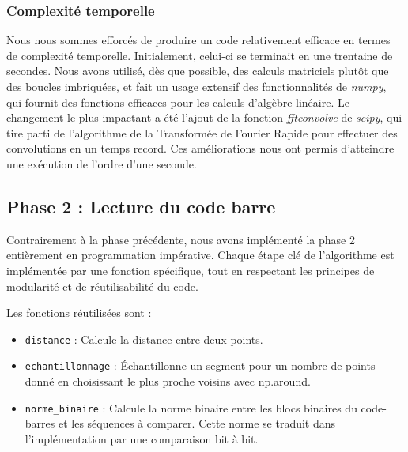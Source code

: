 \documentclass{rapport}
\begin{document}
\subsubsection*{Complexité temporelle}
Nous nous sommes efforcés de produire un code relativement efficace en termes de complexité temporelle.\newline
Initialement, celui-ci se terminait en une trentaine de secondes. 
Nous avons utilisé, dès que possible, des calculs matriciels plutôt que des boucles imbriquées, et fait un usage extensif des fonctionnalités de \textit{numpy}, qui fournit des fonctions efficaces pour les calculs d'algèbre linéaire. Le changement le plus impactant a été l'ajout de la fonction \textit{fftconvolve} de \textit{scipy}, qui tire parti de l'algorithme de la Transformée de Fourier Rapide pour effectuer des convolutions en un temps record.
\newline Ces améliorations nous ont permis d'atteindre une exécution de l'ordre d'une seconde.

\subsection{Phase 2 : Lecture du code barre}

Contrairement à la phase précédente, nous avons implémenté la phase 2 entièrement en programmation impérative.
Chaque étape clé de l'algorithme est implémentée par une fonction spécifique, tout en respectant les principes de modularité et de réutilisabilité du code.

\vspace{0.5cm}

Les fonctions réutilisées sont : 
\begin{itemize}
	\item \texttt{distance} : Calcule la distance entre deux points.
	\item \texttt{echantillonnage} : Échantillonne un segment pour un nombre de points donné en choisissant le plus proche voisins avec np.around.
	\item \texttt{norme\_binaire} : Calcule la norme binaire entre les blocs binaires du code-barres et les séquences à comparer. Cette norme se traduit dans l'implémentation par une comparaison bit à bit.
\end{itemize}

\vspace{0.5cm}
\end{document}
